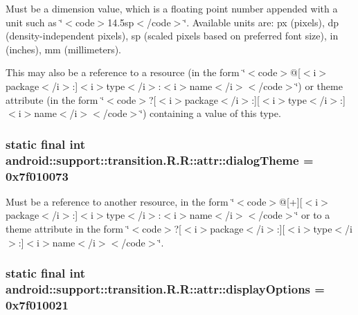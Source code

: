 Must be a dimension value, which is a floating point number appended with a unit such as \char`\"{}$<$code$>$14.5sp$<$/code$>$\char`\"{}. Available units are: px (pixels), dp (density-independent pixels), sp (scaled pixels based on preferred font size), in (inches), mm (millimeters). 

This may also be a reference to a resource (in the form \char`\"{}$<$code$>$@\mbox{[}$<$i$>$package$<$/i$>$:\mbox{]}$<$i$>$type$<$/i$>$:$<$i$>$name$<$/i$>$$<$/code$>$\char`\"{}) or theme attribute (in the form \char`\"{}$<$code$>$?\mbox{[}$<$i$>$package$<$/i$>$:\mbox{]}\mbox{[}$<$i$>$type$<$/i$>$:\mbox{]}$<$i$>$name$<$/i$>$$<$/code$>$\char`\"{}) containing a value of this type. \hypertarget{classandroid_1_1support_1_1transition_1_1_r_1_1attr_bad9d7c728ee486a5695a93fdaeb99c2}{
\subsubsection[{dialogTheme}]{\setlength{\rightskip}{0pt plus 5cm}static final int android::support::transition.R.R::attr::dialogTheme = 0x7f010073}}
\label{classandroid_1_1support_1_1transition_1_1_r_1_1attr_bad9d7c728ee486a5695a93fdaeb99c2}


Must be a reference to another resource, in the form \char`\"{}$<$code$>$@\mbox{[}+\mbox{]}\mbox{[}$<$i$>$package$<$/i$>$:\mbox{]}$<$i$>$type$<$/i$>$:$<$i$>$name$<$/i$>$$<$/code$>$\char`\"{} or to a theme attribute in the form \char`\"{}$<$code$>$?\mbox{[}$<$i$>$package$<$/i$>$:\mbox{]}\mbox{[}$<$i$>$type$<$/i$>$:\mbox{]}$<$i$>$name$<$/i$>$$<$/code$>$\char`\"{}. \hypertarget{classandroid_1_1support_1_1transition_1_1_r_1_1attr_1df16a748f594018899fd49eb6ff9730}{
\subsubsection[{displayOptions}]{\setlength{\rightskip}{0pt plus 5cm}static final int android::support::transition.R.R::attr::displayOptions = 0x7f010021}}
\label{classandroid_1_1support_1_1transition_1_1_r_1_1attr_1df16a748f594018899fd49eb6ff9730}


